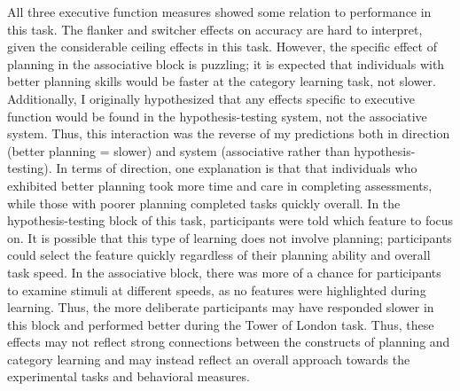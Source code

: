 \documentclass[../dissertation.tex]{subfiles}
\begin{document}
	All three executive function measures showed some relation to performance in this task. The flanker and switcher effects on accuracy are hard to interpret, given the considerable ceiling effects in this task. However, the specific effect of planning in the associative block is puzzling; it is expected that individuals with better planning skills would be faster at the category learning task, not slower. Additionally, I originally hypothesized that any effects specific to executive function would be found in the hypothesis-testing system, not the associative system. Thus, this interaction was the reverse of my predictions both in direction (better planning = slower) and system (associative rather than hypothesis-testing). In terms of direction, one explanation is that that individuals who exhibited better planning took more time and care in completing assessments, while those with poorer planning completed tasks quickly overall. In the hypothesis-testing block of this task, participants were told which feature to focus on. It is possible that this type of learning does not involve planning; participants could select the feature quickly regardless of their planning ability and overall task speed. In the associative block, there was more of a chance for participants to examine stimuli at different speeds, as no features were highlighted during learning. Thus, the more deliberate participants may have responded slower in this block and performed better during the Tower of London task. Thus, these effects may not reflect strong connections between the constructs of planning and category learning and may instead reflect an overall approach towards the experimental tasks and behavioral measures. \par
	
\end{document}
